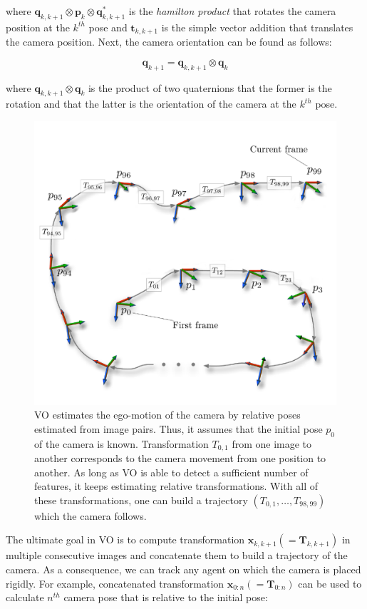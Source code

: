 \documentclass[a4paper]{report}
\numberwithin{figure}{section}
\begin{document}
where $\mathbf{q}_{k,k+1} \otimes \mathbf{p}_k \otimes \mathbf{q}_{k,k+1}^*$ 
is the \textit{hamilton product} that rotates the camera position at the 
$k^{th}$ pose and $\mathbf{t}_{k,k+1}$ is the simple vector addition that 
translates the camera position. Next, the camera orientation can be found as 
follows:

\begin{equation}\label{eq:rotation_cam}
  \mathbf{q}_{k+1} = 
  \mathbf{q}_{k,k+1} \otimes \mathbf{q}_{k}
\end{equation}

where $\mathbf{q}_{k,k+1} \otimes \mathbf{q}_{k}$ is the product of two 
quaternions that the former is the rotation and that the latter is the 
orientation of the camera at the $k^{th}$ pose.

\begin{figure}[H]
	\centering
  \includegraphics[width=0.7\linewidth,natwidth=640,natheight=640]
  {fig/drawings/rel_pose.pdf}
  \caption[Trajectory From Relative Pose]
  {VO estimates the ego-motion of the camera by relative poses estimated from  
  image pairs. Thus, it assumes that the initial pose $p_0$ of the camera is 
  known. Transformation $T_{0,1}$ from one image to another corresponds to the 
  camera movement from one position to another. As long as VO is able to 
  detect a sufficient number of features, it keeps estimating relative 
  transformations. With all of these transformations, one can build a 
  trajectory $(T_{0,1}, \dots, T_{98,99})$ which the camera follows.}
	\label{fig:transformation_ij}
\end{figure}

The ultimate goal in VO is to compute transformation 
$\mathbf{x}_{k,k+1}(=\mathbf{T}_{k,k+1})$ in 
multiple consecutive images and concatenate them to build a trajectory of the 
camera. As a consequence, we can track any agent on which the camera is placed 
rigidly. For example, concatenated transformation 
$\mathbf{x}_{0:n}(=\mathbf{T}_{0:n})$ can be 
used to calculate $n^{th}$ camera pose that is relative to the initial pose:
\end{document}
